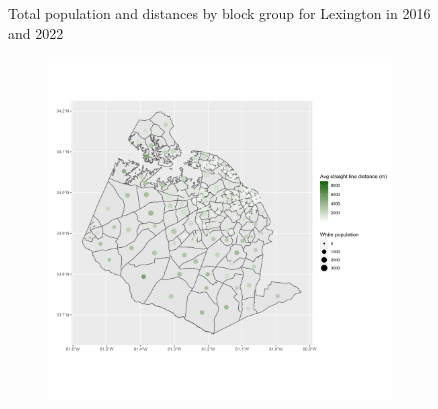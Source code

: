 \documentclass[11pt]{article}
\theoremstyle{remark}
\theoremstyle{definition}
\begin{document}
\begin{figure}
\begin{subfigure}{.5\textwidth}
		\label{sfig:Lexington_2022_bg_dist}
	\end{subfigure}
	\caption{Total population and distances by block group for Lexington in 2016 and 2022}
	\label{fig:Lexington distance Total population maps}
\end{figure}

\begin{figure}
	\begin{subfigure}{.5\textwidth}
		\centering
		\includegraphics[width=\linewidth]{result analysis/Lexington_SC_original_configs/white_pop_and_dist_Lexington_config_original_2016_polls.png}
		\label{sfig:York_2016_bg_dist_pop}
	\end{subfigure} 
	\begin{subfigure}{.5\textwidth}
		\centering

\end{subfigure}
\end{figure}
\end{document}

